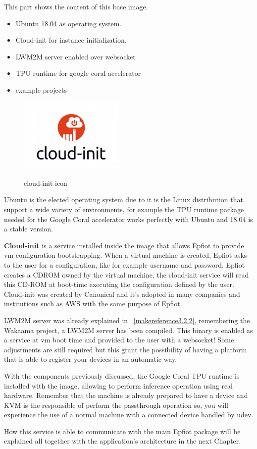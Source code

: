 This part shows the content of this base image.
\begin{itemize}
    \item Ubuntu 18.04 as operating system.
    \item Cloud-init for instance initialization.
    \item LWM2M server enabled over websocket
    \item TPU runtime for google coral accelerator
    \item example projects
\end{itemize}

\begin{figure}[h]%
\centering
    \includegraphics[width=2.0in]{figures/cloud-init.png}
~\caption{cloud-init icon}
\label{figure3.6}
\end{figure}

Ubuntu is the elected operating system due to it is the Linux distribution that support a wide variety of environments, for example the TPU runtime package needed for the Google Coral accelerator works perfectly with Ubuntu and 18.04 is a stable version.

\textbf{Cloud-init} is a service installed inside the image that allows Epfiot to provide vm configuration bootstrapping. When a virtual machine is created, Epfiot asks to the user for a configuration, like for example username and password. Epfiot creates a CDROM owned by the virtual machine, the cloud-init service will read this CD-ROM at boot-time executing the configuration defined by the user. Cloud-init was created by Canonical and it's adopted in many companies and institutions such as AWS with the same purpose of Epfiot.

LWM2M server was already explained in ~\ref{makereference3.2.2}, remembering the Wakaama project, a LWM2M server has been compiled. This binary is enabled as a service at vm boot time and provided to the user with a websocket! Some adjustments are still required but this grant the possibility of having a platform that is able to register your devices in an automatic way.

With the components previously discussed, the Google Coral TPU runtime is installed with the image, allowing to perform inference operation using real hardware. Remember that the machine is already prepared to have a device and KVM is the responsible of perform the passthrough operation so, you will experience the use of a normal machine with a connected device handled by udev.

How this service is able to communicate with the main Epfiot package will be explained all together with the application's architecture in the next Chapter. 







